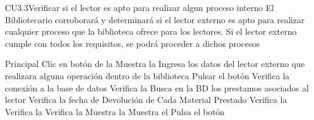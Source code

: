 
	\begin{UseCase}{CU3.3}{Verificar si el lector es apto para realizar algun proceso interno}{
		El Bibliotecario corroborará y determinará si el lector externo es apto para realizar cualquier proceso que la biblioteca ofrece para los lectores. Si el lector externo cumple con todos los requisitos, se podrá proceder a dichos procesos
	}
	\end{UseCase}
	\begin{UCtrayectoria}{Principal}
		\UCpaso[\UCactor] Clic en botón  de la 
		\UCpaso[\UCsist] Muestra la 
		\UCpaso[\UCactor] Ingresa los datos del lector externo que realizara alguna operación dentro de la biblioteca
		\UCpaso[\UCactor] Pulsar el botón 
		\UCpaso[\UCsist] Verifica la conexión a la base de datos 
		\UCpaso[\UCsist] Verifica la  
		\UCpaso[\UCsist] Busca en la BD los prestamos asociados al lector
		\UCpaso[\UCsist] Verifica la fecha de Devolución de Cada Material Prestado
		\UCpaso[\UCsist] Verifica la  
		\UCpaso[\UCsist] Verifica la  
		\UCpaso[\UCsist] Verifica la  
		\UCpaso[\UCsist] Muestra la 
		\UCpaso[\UCsist] Muestra el 
		\UCpaso[\UCactor] Pulsa el botón  
 
	\end{UCtrayectoria}

